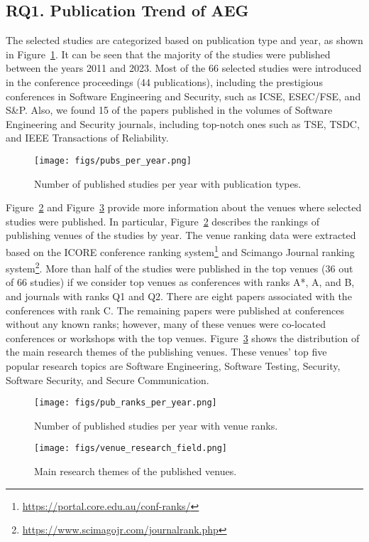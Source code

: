 \subsection{RQ1. Publication Trend of AEG}
\label{sub:rq1}

The selected studies are categorized based on publication type and year, as shown in Figure~\ref{fig:papers-per-year}. It can be seen that the majority of the studies were published between the years 2011 and 2023. Most of the 66 selected studies were introduced in the conference proceedings (44 publications), including the prestigious conferences in Software Engineering and Security, such as ICSE, ESEC/FSE, and S\&P. Also, we found 15 of the papers published in the volumes of Software Engineering and Security journals, including top-notch ones such as TSE, TSDC, and IEEE Transactions of Reliability.
{}
{}

\begin{figure}[htbp]
	\texttt{[image: figs/pubs\_per\_year.png]}
	\caption{Number of published studies per year with publication types.}
	\label{fig:papers-per-year}
\end{figure}

Figure~\ref{fig:paper-ranks-per-year} and Figure~\ref{fig:venue-research-field} provide more information about the venues where selected studies were published. In particular, Figure~\ref{fig:paper-ranks-per-year} describes the rankings of publishing venues of the studies by year. The venue ranking data were extracted based on the ICORE conference ranking system\footnote{\url{https://portal.core.edu.au/conf-ranks/}} and Scimango Journal ranking system\footnote{\url{https://www.scimagojr.com/journalrank.php}}. More than half of the studies were published in the top venues (36 out of 66 studies) if we consider top venues as conferences with ranks A*, A, and B, and journals with ranks Q1 and Q2. There are eight papers associated with the conferences with rank C. The remaining papers were published at conferences without any known ranks; however, many of these venues were co-located conferences or workshops with the top venues.
%
Figure~\ref{fig:venue-research-field} shows the distribution of the main research themes of the publishing venues. These venues' top five popular research topics are Software Engineering, Software Testing, Security, Software Security, and Secure Communication.

\begin{figure}[t]
	\texttt{[image: figs/pub\_ranks\_per\_year.png]}
	\caption{Number of published studies per year with venue ranks.}
	\label{fig:paper-ranks-per-year}
\end{figure}

\begin{figure}[t]
	\texttt{[image: figs/venue\_research\_field.png]}
	\caption{Main research themes of the published venues.}
	\label{fig:venue-research-field}
\end{figure}

{}
{}